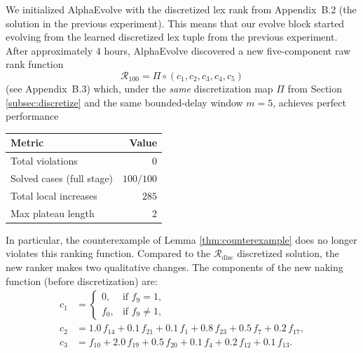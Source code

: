 \documentclass[11pt]{amsart}
\begin{document}
We initialized AlphaEvolve with the discretized lex rank from Appendix~B.2 (the solution in the previous experiment). This means that our evolve block started evolving from the learned discretized lex tuple from the previous experiment. After approximately $4$ hours, AlphaEvolve discovered a new five-component raw rank function
\[\mathcal{R}_{100}=\Pi \circ (c_1,c_2,c_3,c_4,c_5)\] 
(see Appendix~B.3) which, under the \emph{same} discretization map $\Pi$ from
Section \ref{subsec:discretize} and the same bounded-delay window $m=5$, achieves perfect performance 
\begin{center}
\begin{tabular}{@{}lr@{}}
\toprule
Metric & Value \\
\midrule
Total violations  & $0$ \\
Solved cases (full stage) & $100/100$ \\
Total local increases & $285$ \\
Max plateau length & $2$ \\
\bottomrule
\end{tabular}
\end{center}
In particular, the counterexample of Lemma \ref{thm:counterexample} does no longer violates this ranking function. Compared to the $\mathcal R_{\mathrm{disc}}$
discretized solution, the new ranker makes two qualitative changes.
The components of the new naking function (before discretization) are:
\[
\begin{aligned}
c_1 &=
\begin{cases}
0, & \text{if } f_9=1,\\
f_0, & \text{if } f_9\neq 1,
\end{cases}
\\[6pt]
c_2 &= 1.0\,f_{14}+0.1\,f_{21}+0.1\,f_{1}+0.8\,f_{23}+0.5\,f_{7}+0.2\,f_{17},
\\[6pt]
c_3 &= f_{10}+2.0\,f_{19}+0.5\,f_{20}+0.1\,f_{4}+0.2\,f_{12}+0.1\,f_{13}.
\end{aligned}
\]
\end{document}
